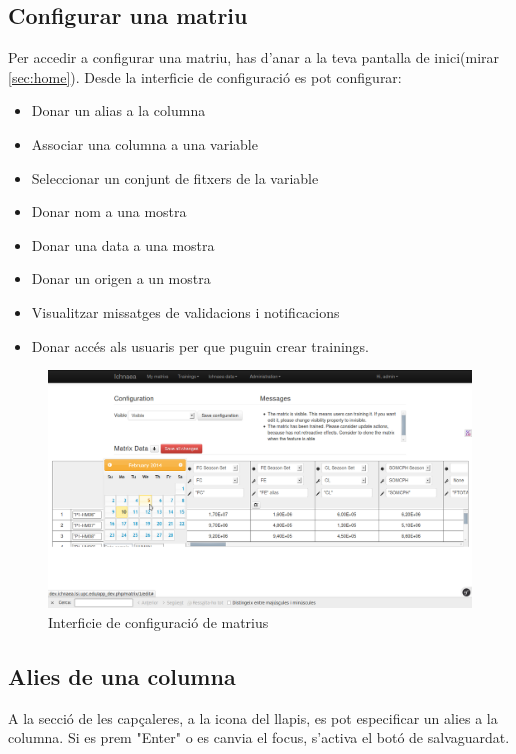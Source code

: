 \begin{itemize}
\section{Configurar una matriu}
\label{sec:configure_matrix}
Per accedir a configurar una matriu, has d'anar a la teva pantalla de inici(mirar \ref{sec:home}). 
Desde la interficie de configuraci\'{o} es pot configurar:
\begin{itemize}
\item Donar un alias a la columna
\item Associar una columna a una variable
\item Seleccionar un conjunt de fitxers de la variable
\item Donar nom a una mostra
\item Donar una data a una mostra
\item Donar un origen a un mostra
\item Visualitzar missatges de validacions i notificacions
\item Donar acc\'{e}s als usuaris per que puguin crear trainings.
\end{itemize}
\begin{figure}[h!]
  \centering
  \includegraphics[scale=0.2]{img/userguide/matrix_configure.png}
  \caption{Interficie de configuraci\'{o} de matrius}
  \label{fig:configure_matrix}
\end{figure}

\subsection{Alies de una columna} 
A la secci\'{o} de les capçaleres, a la icona del llapis, es pot especificar un alies a la columna. Si es prem "Enter" o es canvia el focus, s'activa el bot\'{o} de salvaguardat.


\end{itemize}

